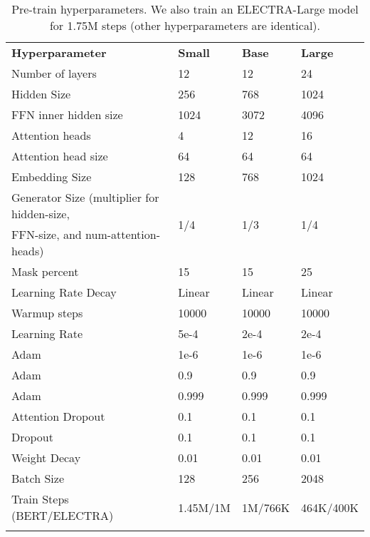 \documentclass{article}
\newcommand\tstrut{\rule{0pt}{2.6ex}}
\newcommand\bstrut{\rule[-1.0ex]{0pt}{0pt}}
\newcommand{\thinline}{\Xhline{1.5\arrayrulewidth}}
\newcommand{\thickline}{\Xhline{2.5\arrayrulewidth}}
\newcommand{\tsep}	{\bstrut \\ \thinline}
\newcommand{\ttop}{\thickline}
\newcommand{\tbottom}{\bstrut \\ \thickline}
\begin{document}
\addtolength{\tabcolsep}{0pt}
\begin{table*}[t!]
\begin{center}
\begin{tabularx}{0.9\linewidth}{X l l l}
\ttop
\textbf{Hyperparameter} & \textbf{Small} & \textbf{Base} & \textbf{Large} \tstrut \tsep
Number of layers & 12 & 12 & 24 \tstrut \\
Hidden Size & 256 & 768 & 1024 \\
FFN inner hidden size & 1024 & 3072 & 4096 \\
Attention heads & 4 & 12 & 16 \\
Attention head size & 64 & 64 & 64 \\
Embedding Size & 128 & 768 & 1024 \\
Generator Size (multiplier for hidden-size, & \multirow{2}{*}{1/4} & \multirow{2}{*}{1/3} & \multirow{2}{*}{1/4} \\
FFN-size, and num-attention-heads) & & & \\
Mask percent & 15 & 15 & 25 \\
Learning Rate Decay & Linear & Linear & Linear \\
Warmup steps & 10000 & 10000 & 10000 \\
Learning Rate & 5e-4 & 2e-4 & 2e-4 \\
Adam  & 1e-6 & 1e-6 & 1e-6 \\
Adam  & 0.9 & 0.9 & 0.9 \\
Adam  & 0.999 & 0.999 & 0.999 \\
Attention Dropout & 0.1 & 0.1 & 0.1 \\
Dropout & 0.1 & 0.1 & 0.1 \\
Weight Decay & 0.01 & 0.01 & 0.01 \\
Batch Size & 128 & 256 & 2048 \\
Train Steps (BERT/ELECTRA) & 1.45M/1M & 1M/766K & 464K/400K \tbottom
\end{tabularx} 
\end{center}
\caption{Pre-train hyperparameters. We also train an ELECTRA-Large model for 1.75M steps (other hyperparameters are identical).}
\label{tab:hyperpre}
\end{table*}
\addtolength{\tabcolsep}{0pt}
\end{document}
